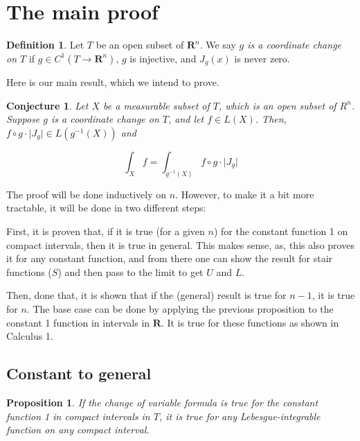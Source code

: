 \documentclass[11pt]{article}
\theoremstyle{definition}
\newtheorem{definition}{Definition}
\theoremstyle{plain}
\newtheorem{prop}{Proposition}
\newtheorem*{conj}{Conjecture}
\newcommand{\R}{\mathbf{R}}
\newcommand{\mo}{^{-1}}
\begin{document}
\section{The main proof}

\begin{definition}
Let $T$ be an open subset of $\R^n$. We say \emph{$g$ is a coordinate change on $T$} if $g \in C^1(T \rightarrow \R^n)$, $g$ is injective, and $J_g(x)$ is never zero.
\end{definition}

Here is our main result, which we intend to prove.

\begin{conj}
Let $X$ be a measurable subset of $T$, which is an open subset of $R^n$. Suppose $g$ is a coordinate change on $T$, and let $f \in L(X)$. Then, ${f \circ g \cdot \lvert J_g \rvert \in L(g\mo(X))}$ and

\[ \int_{X} f =  \int_{g\mo(X)} f \circ g \cdot \lvert J_g \rvert \]
\end{conj}

The proof will be done inductively on $n$. However, to make it a bit more tractable, it will be done in two different steps:

First, it is proven that, if it is true (for a given $n$) for the constant function 1 on compact intervals, then it is true in general. This makes sense, as, this also proves it for any constant function, and from there one can show the result for stair functions ($S$) and then pass to the limit to get $U$ and $L$.

Then, done that, it is shown that if the (general) result is true for $n-1$, it is true for $n$. The base case can be done by applying the previous proposition to the constant 1 function in intervals in $\R$. It is true for these functions as shown in Calculus 1.

\subsection{Constant to general}

\begin{prop}
If the change of variable formula is true for the constant function 1 in compact intervals in $T$, it is true for any Lebesgue-integrable function on any compact interval.
\end{prop}
\end{document}
